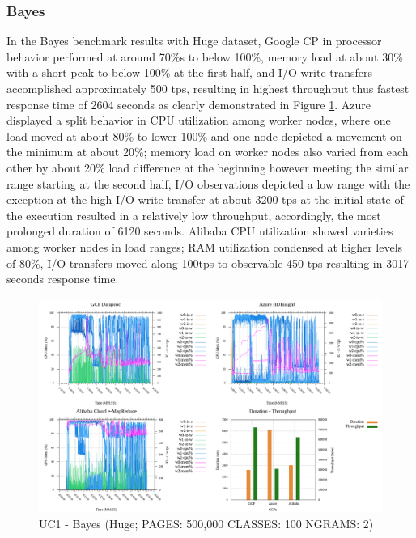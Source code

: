 \documentclass[review]{elsarticle}
\begin{document}
	
	\subsubsection{Bayes}
	In the Bayes benchmark results with Huge dataset, Google CP in processor behavior performed at around 70\%s to below 100\%, memory load at about 30\% with a short peak to below 100\% at the first half, and I/O-write transfers accomplished approximately 500 tps, resulting in highest throughput thus fastest response time of 2604 seconds as clearly demonstrated in Figure \ref{fig:uc1-bayes-h-cmidt}. Azure displayed a split behavior in CPU utilization among worker nodes, where one load moved at about 80\% to lower 100\% and one node depicted a movement on the minimum at about 20\%; memory load on worker nodes also varied from each other by about 20\% load difference at the beginning however meeting the similar range starting at the second half, I/O observations depicted a low range with the exception at the high I/O-write transfer at about 3200 tps at the initial state of the execution resulted in a relatively low throughput, accordingly, the most prolonged duration of 6120 seconds. Alibaba CPU utilization showed varieties among worker nodes in load ranges; RAM utilization condensed at higher levels of 80\%, I/O transfers moved along 100tps to observable 450 tps resulting in 3017 seconds response time.
	
	\begin{figure}[p]
		\caption{UC1 - Bayes (Huge; PAGES: 500,000 CLASSES: 100 NGRAMS: 2)}
		\label{fig:uc1-bayes-h-cmidt}
		\includegraphics[width=\textwidth]{uc1-bayes-h-cmidt}
		\centering
	\end{figure}
	
\end{document}
